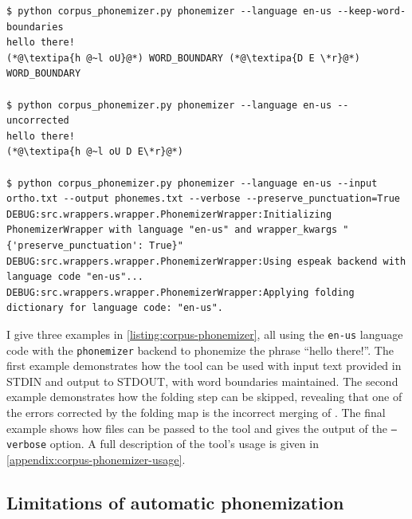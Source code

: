 \begin{lstlisting}[float=th, breaklines=true,caption={Three examples of using Corpus Phonemizer's command-line tool to phonemize the line "hello there!". },label={listing:corpus-phonemizer}]
$ python corpus_phonemizer.py phonemizer --language en-us --keep-word-boundaries
hello there!
(*@\textipa{h @~l oU}@*) WORD_BOUNDARY (*@\textipa{D E \*r}@*) WORD_BOUNDARY

$ python corpus_phonemizer.py phonemizer --language en-us --uncorrected
hello there!
(*@\textipa{h @~l oU D E\*r}@*)

$ python corpus_phonemizer.py phonemizer --language en-us --input ortho.txt --output phonemes.txt --verbose --preserve_punctuation=True
DEBUG:src.wrappers.wrapper.PhonemizerWrapper:Initializing PhonemizerWrapper with language "en-us" and wrapper_kwargs "{'preserve_punctuation': True}"
DEBUG:src.wrappers.wrapper.PhonemizerWrapper:Using espeak backend with language code "en-us"...
DEBUG:src.wrappers.wrapper.PhonemizerWrapper:Applying folding dictionary for language code: "en-us".
\end{lstlisting}

I give three examples in \cref{listing:corpus-phonemizer}, all using the \texttt{en-us} language code with the \texttt{phonemizer} backend to phonemize the phrase ``hello there!''. The first example demonstrates how the tool can be used with input text provided in STDIN and output to STDOUT, with word boundaries maintained. The second example demonstrates how the folding step can be skipped, revealing that one of the errors corrected by the folding map is the incorrect merging of . The final example shows how files can be passed to the tool and gives the output of the \texttt{--verbose} option. A full description of the tool's usage is given in \cref{appendix:corpus-phonemizer-usage}. 

\subsection{Limitations of automatic phonemization}
\label{sec:dataset-limitations}


